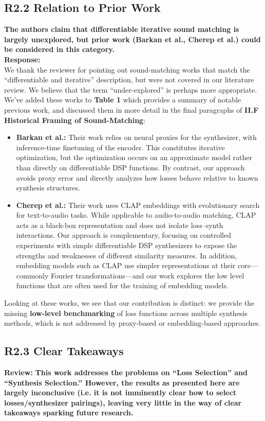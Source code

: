 \documentclass[11pt]{article}
\begin{document}
\subsection{R2.2 Relation to Prior Work}
\label{R2.2}
\noindent \textbf{The authors claim that differentiable iterative sound matching is largely unexplored, but prior work (Barkan et al., Cherep et al.) could be considered in this category.}\\

\noindent\textbf{Response:} \\
We thank the reviewer for pointing out sound-matching works that match the ``differentiable and iterative'' description, but were not covered in our literature review. We believe that the term ``under-explored'' is perhaps more appropriate. We've added these works to \textbf{Table 1} which provides a summary of notable previous work, and discussed them in more detail in the final paragraphs of \textbf{II.F Historical Framing of Sound-Matching}: 
\begin{itemize}
  \item \textbf{Barkan et al.:} Their work relies on neural proxies for the synthesizer, with inference-time finetuning of the encoder. This constitutes iterative optimization, but the optimization occurs on an approximate model rather than directly on differentiable DSP functions. By contrast, our approach avoids proxy error and directly analyzes how losses behave relative to known synthesis structures.  
  \item \textbf{Cherep et al.:} Their work uses CLAP embeddings with evolutionary search for text-to-audio tasks. While applicable to audio-to-audio matching, CLAP acts as a black-box representation and does not isolate loss--synth interactions. Our approach is complementary, focusing on controlled experiments with simple differentiable DSP synthesizers to expose the strengths and weaknesses of different similarity measures.  In addition, embedding models such as CLAP use simpler representations at their core---commonly Fourier transformations---and our work explores the low level functions that are often used for the training of embedding models.
\end{itemize}
Looking at these works, we see that our contribution is distinct: we provide the missing \textbf{low-level benchmarking} of loss functions across multiple synthesis methods, which is not addressed by proxy-based or embedding-based approaches.

\subsection*{R2.3 Clear Takeaways}
\noindent\textbf{Review:}
\textbf{This work addresses the problems on ``Loss Selection'' and ``Synthesis Selection.''  However, the results as presented here are largely inconclusive (i.e. it is not imminently clear how to select losses/synthesizer pairings), leaving very little in the way of clear takeaways sparking future research.\\}
\end{document}
